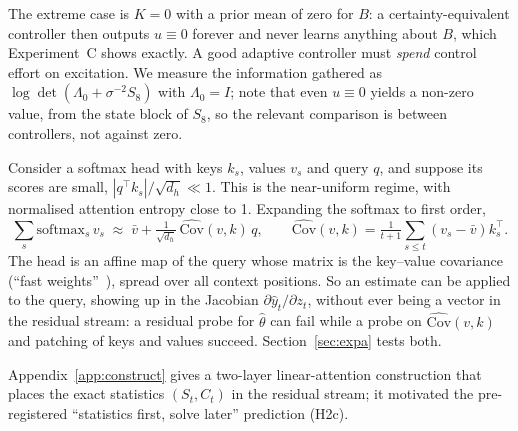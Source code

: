 The extreme case is $K=0$ with a prior mean of zero for $B$: a certainty-equivalent controller then outputs
$u\equiv0$ forever and never learns anything about $B$, which Experiment~C shows exactly. A good adaptive controller
must \emph{spend} control effort on excitation. We measure the information gathered as
$\log\det(\Lambda_0+\sigma^{-2}S_8)$ with $\Lambda_0{=}I$; note that even $u\equiv0$ yields a non-zero value, from the
state block of $S_8$, so the relevant comparison is between controllers, not against zero.

\begin{remark}\label{rem:fw}
Consider a softmax head with keys $k_s$, values $v_s$ and query $q$, and suppose its scores are small,
$|q^\top k_s|/\sqrt{d_h}\ll1$. This is the near-uniform regime, with normalised attention entropy close to 1. Expanding
the softmax to first order,
\begin{equation}
\textstyle\sum_s \mathrm{softmax}_s\,v_s \;\approx\; \bar v + \tfrac{1}{\sqrt{d_h}}\,\widehat{\mathrm{Cov}}(v,k)\,q,
\qquad \widehat{\mathrm{Cov}}(v,k)=\tfrac1{t+1}\textstyle\sum_{s\le t}(v_s-\bar v)k_s^\top .
\label{eq:fw}
\end{equation}
The head is an affine map of the query whose matrix is the key--value covariance (``fast
weights''~\citep{vonoswald2023transformers}), spread over all context positions. So an estimate can be applied to the
query, showing up in the Jacobian $\partial\hat y_t/\partial z_t$, without ever being a vector in the residual stream: a
residual probe for $\hat\theta$ can fail while a probe on $\widehat{\mathrm{Cov}}(v,k)$ and patching of keys and values
succeed. Section~\ref{sec:expa} tests both.
\end{remark}

Appendix~\ref{app:construct} gives a two-layer linear-attention construction that places the exact statistics $(S_t,C_t)$ in the residual stream; it motivated the pre-registered ``statistics first, solve later'' prediction (H2c).
